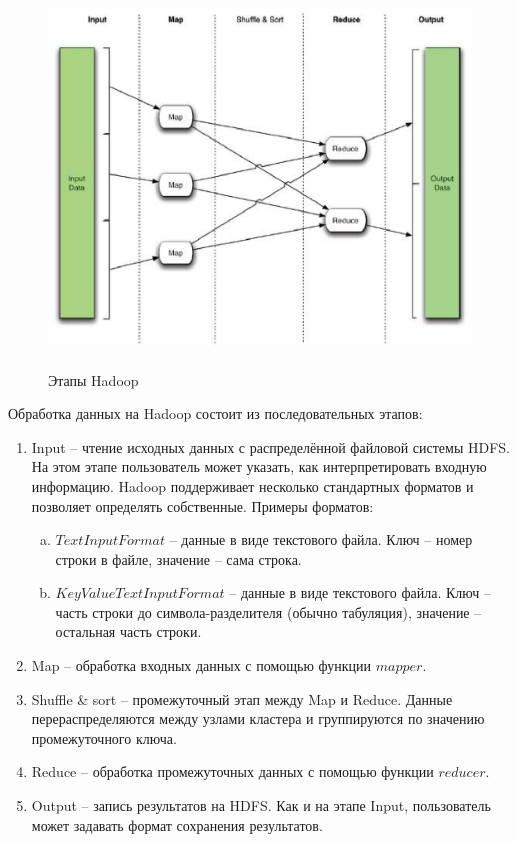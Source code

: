 \documentclass[a4paper,11pt]{article}
\begin{document}
\begin{figure}[h]
    \begin{center}
        \includegraphics[height=100mm]{lab2/hadoop.eps}
        \caption{Этапы Hadoop}
    \end{center}
\end{figure}

Обработка данных на Hadoop состоит из последовательных этапов:
\begin{enumerate}
\item Input -- чтение исходных данных с распределённой файловой системы HDFS.
  На этом этапе пользователь может указать, как интерпретировать входную
  информацию. Hadoop поддерживает несколько стандартных форматов и позволяет
  определять собственные. Примеры форматов:
  \begin{enumerate}[(a)]
  \item $TextInputFormat$ -- данные в виде текстового файла. Ключ -- номер
    строки в файле, значение -- сама строка.
  \item $KeyValueTextInputFormat$ -- данные в виде текстового файла. Ключ --
    часть строки до символа-разделителя (обычно табуляция), значение --
    остальная часть строки.
  \end{enumerate}
\item Map -- обработка входных данных с помощью функции $mapper$.
\item Shuffle \& sort -- промежуточный этап между Map и Reduce. Данные
  перераспределяются между узлами кластера и группируются по значению
  промежуточного ключа.
\item Reduce -- обработка промежуточных данных с помощью функции $reducer$.
\item Output -- запись результатов на HDFS. Как и на этапе Input, пользователь
  может задавать формат сохранения результатов.
\end{enumerate}
\end{document}
